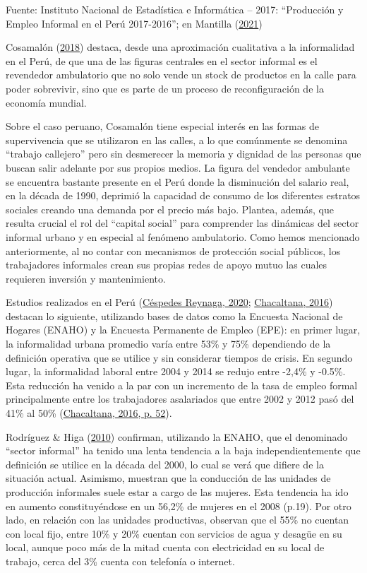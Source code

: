 \documentclass[
  letterpaper,
  12pt,
  oneside,
  spanish,
  doublespacing,
  headsepline,
  parskip]{MastersDoctoralThesis}
\begin{document}
\noindent \small Fuente: Instituto Nacional de Estadística e Informática
-- 2017: ``Producción y Empleo Informal en el Perú 2017-2016''; en
Mantilla (\protect\hyperlink{ref-mantilla2021}{2021}) \normalsize

\break

Cosamalón (\protect\hyperlink{ref-cosamaluxf3n2018}{2018}) destaca,
desde una aproximación cualitativa a la informalidad en el Perú, de que
una de las figuras centrales en el sector informal es el revendedor
ambulatorio que no solo vende un stock de productos en la calle para
poder sobrevivir, sino que es parte de un proceso de reconfiguración de
la economía mundial.

Sobre el caso peruano, Cosamalón tiene especial interés en las formas de
supervivencia que se utilizaron en las calles, a lo que comúnmente se
denomina ``trabajo callejero'' pero sin desmerecer la memoria y dignidad
de las personas que buscan salir adelante por sus propios medios. La
figura del vendedor ambulante se encuentra bastante presente en el Perú
donde la disminución del salario real, en la década de 1990, deprimió la
capacidad de consumo de los diferentes estratos sociales creando una
demanda por el precio más bajo. Plantea, además, que resulta crucial el
rol del ``capital social'' para comprender las dinámicas del sector
informal urbano y en especial al fenómeno ambulatorio. Como hemos
mencionado anteriormente, al no contar con mecanismos de protección
social públicos, los trabajadores informales crean sus propias redes de
apoyo mutuo las cuales requieren inversión y mantenimiento.

Estudios realizados en el Perú
(\protect\hyperlink{ref-cuxe9spedesreynaga2020}{Céspedes Reynaga, 2020};
\protect\hyperlink{ref-chacaltana2016}{Chacaltana, 2016}) destacan lo
siguiente, utilizando bases de datos como la Encuesta Nacional de
Hogares (ENAHO) y la Encuesta Permanente de Empleo (EPE): en primer
lugar, la informalidad urbana promedio varía entre 53\% y 75\%
dependiendo de la definición operativa que se utilice y sin considerar
tiempos de crisis. En segundo lugar, la informalidad laboral entre 2004
y 2014 se redujo entre -2,4\% y -0.5\%. Esta reducción ha venido a la
par con un incremento de la tasa de empleo formal principalmente entre
los trabajadores asalariados que entre 2002 y 2012 pasó del 41\% al 50\%
(\protect\hyperlink{ref-chacaltana2016}{Chacaltana, 2016, p. 52}).

Rodríguez \& Higa (\protect\hyperlink{ref-rodruxedguez2010}{2010})
confirman, utilizando la ENAHO, que el denominado ``sector informal'' ha
tenido una lenta tendencia a la baja independientemente que definición
se utilice en la década del 2000, lo cual se verá que difiere de la
situación actual. Asimismo, muestran que la conducción de las unidades
de producción informales suele estar a cargo de las mujeres. Esta
tendencia ha ido en aumento constituyéndose en un 56,2\% de mujeres en
el 2008 (p.19). Por otro lado, en relación con las unidades productivas,
observan que el 55\% no cuentan con local fijo, entre 10\% y 20\%
cuentan con servicios de agua y desagüe en su local, aunque poco más de
la mitad cuenta con electricidad en su local de trabajo, cerca del 3\%
cuenta con telefonía o internet.
\end{document}
